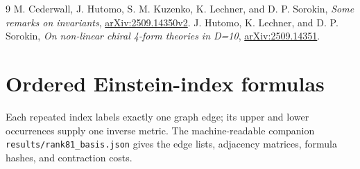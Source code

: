 \documentclass[11pt]{article}
\begin{document}
\begin{thebibliography}{9}
 M. Cederwall, J. Hutomo, S. M. Kuzenko, K. Lechner,
and D. P. Sorokin, \emph{Some remarks on invariants},
\href{https://arxiv.org/abs/2509.14350v2}{arXiv:2509.14350v2}.
 J. Hutomo, K. Lechner, and D. P. Sorokin,
\emph{On non-linear chiral 4-form theories in D=10},
\href{https://arxiv.org/abs/2509.14351}{arXiv:2509.14351}.
\end{thebibliography}

\clearpage\appendix
\section{Ordered Einstein-index formulas}
Each repeated index labels exactly one graph edge; its upper and lower
occurrences supply one inverse metric. The machine-readable companion
\texttt{results/rank81\_basis.json} gives the edge lists, adjacency matrices,
formula hashes, and contraction costs.
\small

\end{document}
